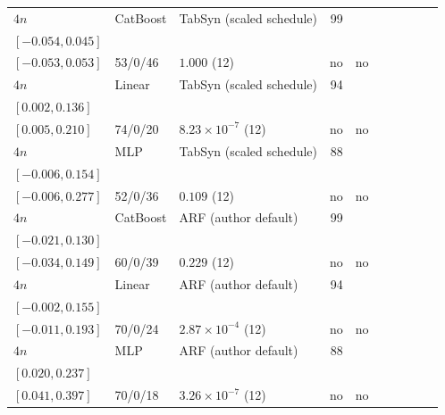 \begin{longtable}{@{}ll>{\raggedright\arraybackslash}p{1.1in}rllrlll@{}}
$4n$ & CatBoost & TabSyn (scaled schedule) & 99 & \begin{tabular}[t]{@{}l@{}}$0.006$\\\tiny$[-0.054, 0.045]$\end{tabular} & \begin{tabular}[t]{@{}l@{}}$-0.003$\\\tiny$[-0.053, 0.053]$\end{tabular} & 53/0/46 & $1.000$ (12) & no & no \\
$4n$ & Linear & TabSyn (scaled schedule) & 94 & \begin{tabular}[t]{@{}l@{}}$0.037$\\\tiny$[0.002, 0.136]$\end{tabular} & \begin{tabular}[t]{@{}l@{}}$0.069$\\\tiny$[0.005, 0.210]$\end{tabular} & 74/0/20 & $8.23\times 10^{-7}$ (12) & no & no \\
$4n$ & MLP & TabSyn (scaled schedule) & 88 & \begin{tabular}[t]{@{}l@{}}$0.005$\\\tiny$[-0.006, 0.154]$\end{tabular} & \begin{tabular}[t]{@{}l@{}}$0.054$\\\tiny$[-0.006, 0.277]$\end{tabular} & 52/0/36 & $0.109$ (12) & no & no \\
$4n$ & CatBoost & ARF (author default) & 99 & \begin{tabular}[t]{@{}l@{}}$0.035$\\\tiny$[-0.021, 0.130]$\end{tabular} & \begin{tabular}[t]{@{}l@{}}$0.048$\\\tiny$[-0.034, 0.149]$\end{tabular} & 60/0/39 & $0.229$ (12) & no & no \\
$4n$ & Linear & ARF (author default) & 94 & \begin{tabular}[t]{@{}l@{}}$0.045$\\\tiny$[-0.002, 0.155]$\end{tabular} & \begin{tabular}[t]{@{}l@{}}$0.062$\\\tiny$[-0.011, 0.193]$\end{tabular} & 70/0/24 & $2.87\times 10^{-4}$ (12) & no & no \\
$4n$ & MLP & ARF (author default) & 88 & \begin{tabular}[t]{@{}l@{}}$0.117$\\\tiny$[0.020, 0.237]$\end{tabular} & \begin{tabular}[t]{@{}l@{}}$0.137$\\\tiny$[0.041, 0.397]$\end{tabular} & 70/0/18 & $3.26\times 10^{-7}$ (12) & no & no \\

\end{longtable}
